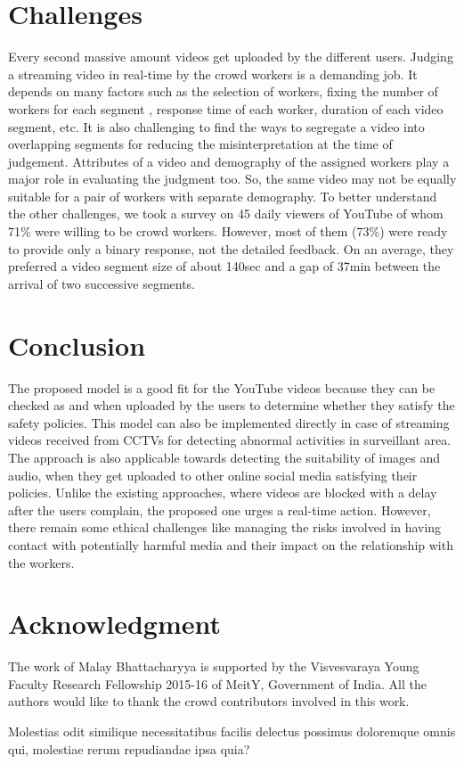 \documentclass[letterpaper]{article}
\begin{document}
\section{Challenges}
Every second massive amount videos get uploaded by the different users. Judging a streaming video in real-time by the crowd workers is a demanding job. It depends on many factors such as the selection of workers, fixing the number of workers for each segment \cite{carvalho2016}, response time of each worker, duration of each video segment, etc. It is also challenging to find the ways to segregate a video into overlapping segments for reducing the misinterpretation at the time of judgement. Attributes of a video and demography of the assigned workers play a major role in evaluating the judgment too. So, the same video may not be equally suitable for a pair of workers with separate demography. To better understand the other challenges, we took a survey on 45 daily viewers of YouTube of whom 71\% were willing to be crowd workers. However, most of them (73\%) were ready to provide only a binary response, not the detailed feedback. On an average, they preferred a video segment size of about 140sec and a gap of 37min between the arrival of two successive segments.




\vspace{-0.98mm}
\section{Conclusion}
The proposed model is a good fit for the YouTube videos because they can be checked as and when uploaded by the users to determine whether they satisfy the safety policies. This model can also be implemented directly in case of streaming videos received from CCTVs for detecting abnormal activities in surveillant area. The approach is also applicable towards detecting the suitability of images and audio, when they get uploaded to other online social media satisfying their policies. Unlike the existing approaches, where videos are blocked with a delay after the users complain, the proposed one urges a real-time action. However, there remain some ethical challenges like managing the risks involved in having contact with potentially harmful media and their impact on the relationship with the workers.




\section{Acknowledgment}
The work of Malay Bhattacharyya is supported by the Visvesvaraya Young Faculty Research Fellowship 2015-16 of MeitY, Government of India. All the authors would like to thank the crowd contributors involved in this work.





Molestias odit similique necessitatibus facilis delectus possimus doloremque omnis qui, molestiae rerum repudiandae ipsa quia?\clearpage

\end{document}
